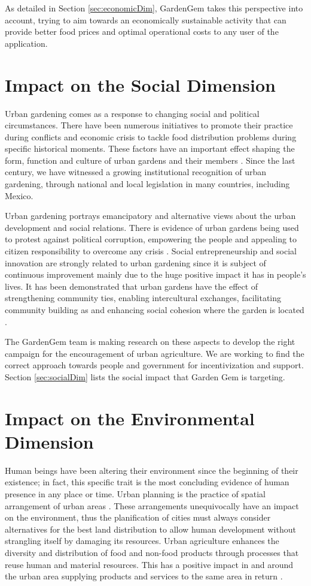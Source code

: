 As detailed in Section \ref{sec:economicDim}, GardenGem takes this perspective into account, trying to aim towards an economically sustainable activity that can provide better food prices and optimal operational costs to any user of the application.

\section{Impact on the Social Dimension}

Urban gardening comes as a response to changing social and political circumstances. There have been numerous initiatives to promote their practice during conflicts and economic crisis to tackle food distribution problems during specific historical moments. These factors have an important effect shaping the form, function and culture of urban gardens and their members \cite{Calvet-Mir2019}. Since the last century, we have witnessed a growing institutional recognition of urban gardening, through national and local legislation in many countries, including Mexico.

Urban gardening portrays emancipatory and alternative views about the urban development and social relations. There is evidence of urban gardens being used to protest against political corruption, empowering the people and appealing to citizen responsibility to overcome any crisis \cite{Certoma2015}. Social entrepreneurship and social innovation are strongly related to urban gardening since it is subject of continuous improvement mainly due to the huge positive impact it has in people’s lives. It has been demonstrated that urban gardens have the effect of strengthening community ties, enabling intercultural exchanges, facilitating community building as and enhancing social cohesion where the garden is located \cite{Calvet-Mir2019}.

The GardenGem team is making research on these aspects to develop the right campaign for the encouragement of urban agriculture. We are working to find the correct approach towards people and government for incentivization and support. Section \ref{sec:socialDim} lists the social impact that Garden Gem is targeting.


\section{Impact on the Environmental Dimension}

Human beings have been altering their environment since the beginning of their existence; in fact, this specific trait is the most concluding evidence of human presence in any place or time. Urban planning is the practice of spatial arrangement of urban areas \cite{Certoma2015}. These arrangements unequivocally have an impact on the environment, thus the planification of cities must always consider alternatives for the best land distribution to allow human development without strangling itself by damaging its resources. Urban agriculture enhances the diversity and distribution of food and non-food products through processes that reuse human and material resources. This has a positive impact in and around the urban area supplying products and services to the same area in return \cite{Broadway2009}.

